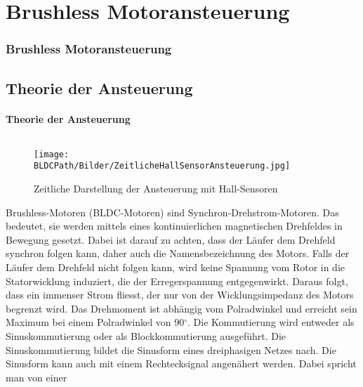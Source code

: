 \ifSTANDALONE
\section{Brushless Motoransteuerung}
\fi
\ifEMBED
\subsubsection{Brushless Motoransteuerung}
\fi

\ifEMBED
    \BLDCcollab
\fi
\ifSTANDALONE
    \subsection{Theorie der Ansteuerung}
    \fi
\ifEMBED
    \paragraph{Theorie der Ansteuerung}$~~$\\
    \fi
    \ifEMBED
        \begin{wrapfigure}{r}{0.50\textwidth}
           	\texttt{[image: \\BLDCPath/Bilder/ZeitlicheHallSensorAnsteuerung.jpg]}
         	\centering
           	\caption[Zeitliche Darstellung der Ansteuerung mit Hall-Sensoren]
           	{Zeitliche Darstellung der Ansteuerung mit Hall-Sensoren \cite{AppNote:BrushlessuC}}
            \label{abb:ZeitlicheAnsteuerungBrushlessMotor}
        \end{wrapfigure}
    \fi
        Brushless-Motoren (BLDC-Motoren) sind Synchron-Drehstrom-Motoren. Das 
        bedeutet, sie werden mittels eines kontinuierlichen magnetischen 
        Drehfeldes in Bewegung gesetzt.  Dabei ist darauf zu achten, dass der 
        Läufer dem Drehfeld synchron folgen kann, daher auch die 
        Namensbezeichnung des Motors. Falls der Läufer dem Drehfeld nicht 
        folgen kann, wird keine Spannung vom Rotor in die Statorwicklung 
        induziert, die der Erregerspannung entgegenwirkt. Daraus folgt, dass 
        ein immenser Strom fliesst, der nur von der Wicklungsimpedanz des 
        Motors begrenzt wird. Das Drehmoment ist abhängig vom Polradwinkel und 
        erreicht sein Maximum bei einem Polradwinkel von 90$^\circ$. Die 
        Kommutierung wird entweder als Sinuskommutierung oder als 
        Blockkommutierung ausgeführt. Die Sinuskommutierung bildet die 
        Sinusform eines dreiphasigen Netzes nach. Die Sinusform kann auch mit 
        einem Rechtecksignal angenähert werden. Dabei spricht man von einer 
